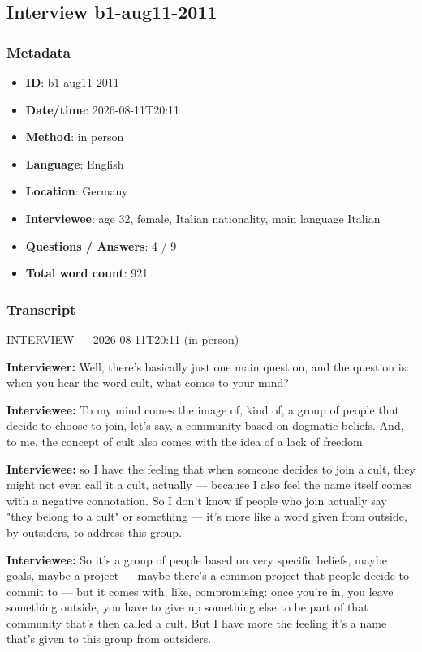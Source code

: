 \subsection{Interview b1-aug11-2011}\label{int:b1-aug11-2011}
\subsubsection*{Metadata}
\begin{itemize}
  \item \textbf{ID}: b1-aug11-2011
  \item \textbf{Date/time}: 2026-08-11T20:11
  \item \textbf{Method}: in person
  \item \textbf{Language}: English
  \item \textbf{Location}: Germany
  \item \textbf{Interviewee}: age 32, female, Italian nationality, main language Italian
  \item \textbf{Questions / Answers}: 4 / 9
  \item \textbf{Total word count}: 921
\end{itemize}
\subsubsection*{Transcript}
INTERVIEW — 2026-08-11T20:11 (in person)

\textbf{Interviewer:} Well, there's basically just one main question, and the question is: when you hear the word cult, what comes to your mind?

\textbf{Interviewee:} To my mind comes the image of, kind of, a group of people that decide to choose to join, let's say, a community based on dogmatic beliefs. And, to me, the concept of cult also comes with the idea of a lack of freedom

\textbf{Interviewee:} so I have the feeling that when someone decides to join a cult, they might not even call it a cult, actually — because I also feel the name itself comes with a negative connotation. So I don't know if people who join actually say "they belong to a cult" or something — it's more like a word given from outside, by outsiders, to address this group.

\textbf{Interviewee:} So it's a group of people based on very specific beliefs, maybe goals, maybe a project — maybe there's a common project that people decide to commit to — but it comes with, like, compromising: once you're in, you leave something outside, you have to give up something else to be part of that community that's then called a cult. But I have more the feeling it's a name that's given to this group from outsiders.

